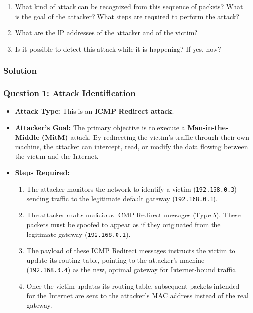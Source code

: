 \documentclass{article}
\begin{document}
\begin{enumerate}
    \item[\textbf{1.}] [3 points] What kind of attack can be recognized from this sequence of packets? What is the goal of the attacker? What steps are required to perform the attack?
    \item[\textbf{2.}] [1 point] What are the IP addresses of the attacker and of the victim?
    \item[\textbf{3.}] [2 points] Is it possible to detect this attack while it is happening? If yes, how?
\end{enumerate}

\subsubsection*{Solution}
\subsubsection*{Question 1: Attack Identification}
\begin{itemize}
    \item \textbf{Attack Type:} This is an \textbf{ICMP Redirect attack}.
    \item \textbf{Attacker's Goal:} The primary objective is to execute a \textbf{Man-in-the-Middle (MitM)} attack. By redirecting the victim's traffic through their own machine, the attacker can intercept, read, or modify the data flowing between the victim and the Internet.
    \item \textbf{Steps Required:}
    \begin{enumerate}
        \item The attacker monitors the network to identify a victim (\texttt{192.168.0.3}) sending traffic to the legitimate default gateway (\texttt{192.168.0.1}).
        \item The attacker crafts malicious ICMP Redirect messages (Type 5). These packets must be spoofed to appear as if they originated from the legitimate gateway (\texttt{192.168.0.1}).
        \item The payload of these ICMP Redirect messages instructs the victim to update its routing table, pointing to the attacker's machine (\texttt{192.168.0.4}) as the new, optimal gateway for Internet-bound traffic.
        \item Once the victim updates its routing table, subsequent packets intended for the Internet are sent to the attacker's MAC address instead of the real gateway.
    \end{enumerate}
\end{itemize}
\end{document}
